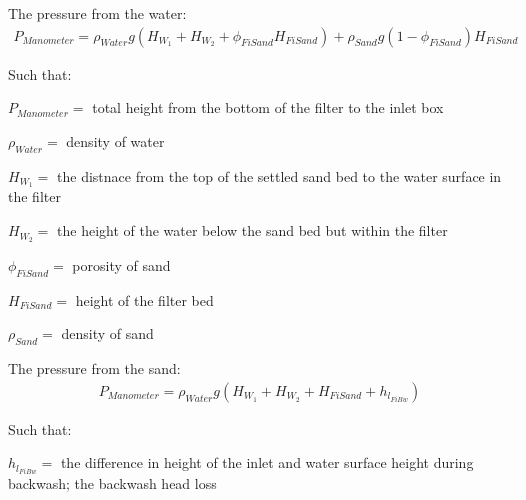 \documentclass[letterpaper,10pt,english]{sphinxmanual}
\begin{document}
{The pressure from the water:
\begin{equation}\label{equation:Filtration/Filtration_Derivations:Filtration/Filtration_Derivations:0}
\begin{split}P_{Manometer} = \rho_{Water} g \left( H_{W_1} + H_{W_2} + \phi_{FiSand} H_{FiSand} \right) + \rho_{Sand} g \left( 1 - \phi_{FiSand} \right) H_{FiSand}\end{split}
\end{equation}
\begin{DUlineblock}{0em}
\item[] Such that:
\item[] \(P_{Manometer} =\) total height from the bottom of the filter to the inlet box
\item[] \(\rho_{Water} =\) density of water
\item[] \(H_{W_1} =\) the distnace from the top of the settled sand bed to the water surface in the filter
\item[] \(H_{W_2} =\) the height of the water below the sand bed but within the filter
\item[] \(\phi_{FiSand} =\) porosity of sand
\item[] \(H_{FiSand} =\) height of the filter bed
\item[] \(\rho_{Sand} =\) density of sand
\end{DUlineblock}

The pressure from the sand:
\begin{equation}\label{equation:Filtration/Filtration_Derivations:Filtration/Filtration_Derivations:1}
\begin{split}P_{Manometer} = \rho_{Water} g \left( H_{W_1} + H_{W_2} + H_{FiSand} + h_{l_{FiBw}} \right)\end{split}
\end{equation}
\begin{DUlineblock}{0em}
\item[] Such that:
\item[] \(h_{l_{FiBw}} =\) the difference in height of the inlet and water surface height during backwash; the backwash head loss
\end{DUlineblock}

}
\end{document}
